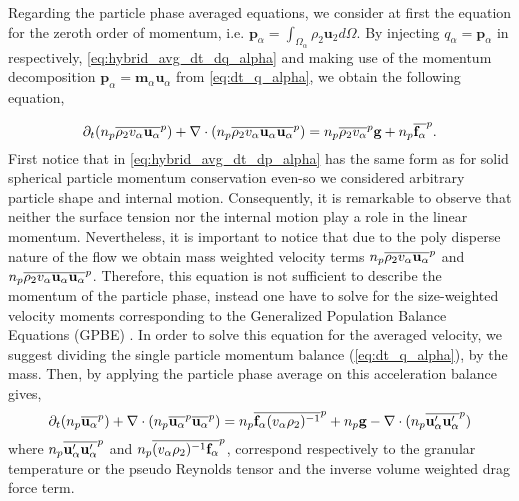 Regarding the particle phase averaged equations, we consider at first the equation for the zeroth order of momentum, i.e. $\textbf{p}_\alpha = \int_{\Omega_\alpha} \rho_2 \textbf{u}_2 d\Omega$. 
By injecting $q_\alpha = \textbf{p}_\alpha$ in respectively, \ref{eq:hybrid_avg_dt_dq_alpha} and making use of the momentum decomposition $\textbf{p}_\alpha = \textbf{m}_\alpha \textbf{u}_\alpha$ from \ref{eq:dt_q_alpha}, we obtain the following equation,

\begin{equation}
    \partial_t (n_p\overline{\rho_2 v_\alpha\textbf{u}_\alpha}^{p})
    + \mathbf{\nabla} \cdot(n_p\overline{\rho_2 v_\alpha \textbf{u}_\alpha \textbf{u}_\alpha }^{p})
    = n_p\overline{\rho_2 v_\alpha}^{p}\textbf{g}
    + n_p\overline{\textbf{f}_\alpha}^{p}.
    \label{eq:hybrid_avg_dt_dp_alpha}\\
\end{equation}
First notice that in \ref{eq:hybrid_avg_dt_dp_alpha} has the same form as for solid spherical particle momentum conservation \citep{jackson1997locally} even-so we considered arbitrary particle shape and internal motion. 
Consequently, it is remarkable to observe that neither the surface tension nor the internal motion play a role in the linear momentum. 
Nevertheless, it is important to notice that due to the poly disperse nature of the flow we obtain mass weighted velocity terms $n_p\overline{\rho_2 v_\alpha\textbf{u}_\alpha}^{p}$ and $n_p\overline{\rho_2 v_\alpha\textbf{u}_\alpha\textbf{u}_\alpha}^{p}$. 
Therefore, this equation is not sufficient to describe the momentum of the particle phase, instead one have to solve for the size-weighted velocity moments corresponding to the Generalized Population Balance Equations (GPBE)  \citep{fox2023generalized}. 
In order to solve this equation for the averaged velocity, we suggest dividing the single particle momentum balance (\ref{eq:dt_q_alpha}), by the mass. 
Then, by applying the particle phase average on this acceleration balance gives, 
\begin{equation}
    \partial_t (n_p\overline{\textbf{u}_\alpha}^{p})
    + \mathbf{\nabla} \cdot(n_p\overline{\textbf{u}_\alpha}^{p}\overline{ \textbf{u}_\alpha }^{p})
    = 
    n_p\overline{\textbf{f}_\alpha(v_\alpha\rho_2)^{-1}}^{p}
    + n_p \textbf{g}
    - \mathbf{\nabla} \cdot(n_p\overline{\textbf{u}'_\alpha \textbf{u}'_\alpha }^{p})
    \label{eq:hybrid_avg_dt_dp2_alpha}
\end{equation}
where $n_p\overline{\textbf{u}'_\alpha \textbf{u}'_\alpha }^{p}$ and $n_p\overline{(v_\alpha\rho_2)^{-1} \textbf{f}_\alpha }^{p}$, correspond respectively to the granular temperature or the pseudo Reynolds tensor \citep{jackson1997locally} and the inverse volume weighted drag force term. 
